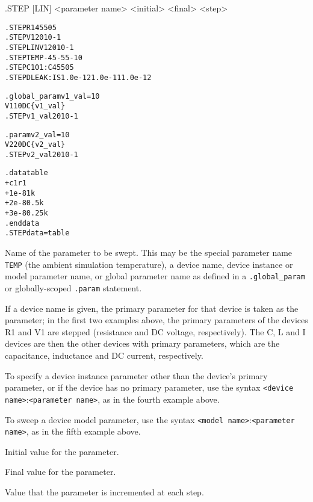 \begin{Command}

\format
.STEP [LIN] <parameter name> <initial> <final> <step>

\examples
\begin{alltt}
.STEP R1 45 50 5
.STEP V1 20 10 -1
.STEP LIN V1 20 10 -1
.STEP TEMP -45 -55 -10
.STEP C101:C 45 50 5
.STEP DLEAK:IS 1.0e-12 1.0e-11 1.0e-12

.global_param v1_val=10
V1 1 0 DC \{v1_val\}
.STEP v1_val 20 10 -1

.param v2_val=10
V2 2 0 DC \{v2_val\}
.STEP v2_val 20 10 -1

.data table
+ c1 r1
+ 1e-8  1k
+ 2e-8  0.5k
+ 3e-8  0.25k
.enddata
.STEP data=table
\end{alltt}

\arguments

\begin{Arguments}

Name of the parameter to be swept.  This may be the special parameter
name \texttt{TEMP} (the ambient simulation temperature), a device
name, device instance or model parameter name, or global parameter
name as defined in a \texttt{.global\_param} or globally-scoped \texttt{.param} statement.  

If a device name is given, the primary parameter for that device is
taken as the parameter; in the first two examples above, the primary
parameters of the devices R1 and V1 are stepped (resistance and DC
voltage, respectively).  The C, L and I devices are then the other
devices with primary parameters, which are the capacitance, inductance 
and DC current, respectively.

To specify a device instance parameter other than the device's primary
parameter, or if the device has no primary parameter, use the 
syntax \texttt{<device name>}:\texttt{<parameter name>}, as
in the fourth example above.

To sweep a device model parameter, use the syntax \texttt{<model
name>}:\texttt{<parameter name>}, as in the fifth example above.

Initial value for the parameter.

Final value for the parameter.

Value that the parameter is incremented at each step.

\end{Arguments}

\comments


\end{Command}
